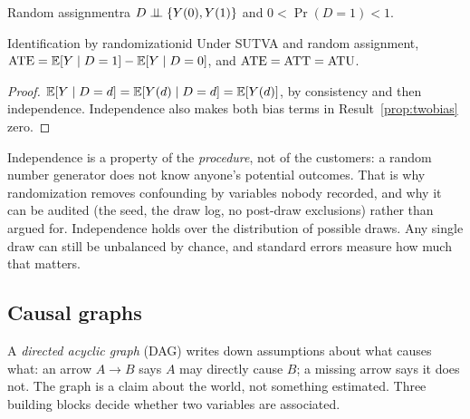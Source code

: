 \documentclass[11pt]{article}
\begin{document}
\begin{assum}{Random assignment}{ra}
$D \perp\!\!\!\perp \{Y(0), Y(1)\}$ and $0 < \Pr(D=1) < 1$.
\end{assum}

\begin{prop}{Identification by randomization}{id}
Under SUTVA and random assignment, $\text{ATE} = \mathbb{E}[Y \mid D=1] - \mathbb{E}[Y \mid D=0]$, and $\text{ATE} = \text{ATT} = \text{ATU}$.
\end{prop}
\begin{proof}
$\mathbb{E}[Y \mid D=d] = \mathbb{E}[Y(d) \mid D=d] = \mathbb{E}[Y(d)]$, by consistency and then independence. Independence also
makes both bias terms in Result~\ref{prop:twobias} zero.
\end{proof}

Independence is a property of the \emph{procedure}, not of the customers: a random number generator does
not know anyone's potential outcomes. That is why randomization removes confounding by variables nobody
recorded, and why it can be audited (the seed, the draw log, no post-draw exclusions) rather than argued
for. Independence holds over the distribution of possible draws. Any single draw can still be unbalanced by
chance, and standard errors measure how much that matters.

\subsection{Causal graphs}

A \emph{directed acyclic graph} (DAG) writes down assumptions about what causes what: an arrow $A \to B$
says $A$ may directly cause $B$; a missing arrow says it does not. The graph is a claim about the world,
not something estimated. Three building blocks decide whether two variables are associated.

\begin{center}
\end{center}
\end{document}
